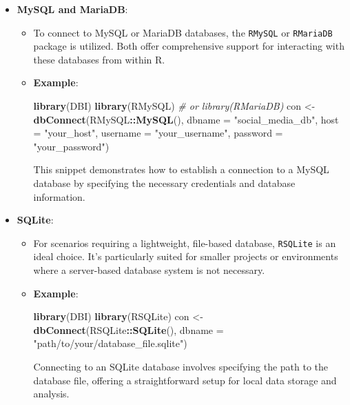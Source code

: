 \documentclass[
]{book}
\newenvironment{Shaded}{\begin{snugshade}}{\end{snugshade}}
\newcommand{\AttributeTok}[1]{\textcolor[rgb]{0.13,0.29,0.53}{#1}}
\newcommand{\CommentTok}[1]{\textcolor[rgb]{0.56,0.35,0.01}{\textit{#1}}}
\newcommand{\FunctionTok}[1]{\textcolor[rgb]{0.13,0.29,0.53}{\textbf{#1}}}
\newcommand{\NormalTok}[1]{#1}
\newcommand{\OtherTok}[1]{\textcolor[rgb]{0.56,0.35,0.01}{#1}}
\newcommand{\SpecialCharTok}[1]{\textcolor[rgb]{0.81,0.36,0.00}{\textbf{#1}}}
\newcommand{\StringTok}[1]{\textcolor[rgb]{0.31,0.60,0.02}{#1}}
\providecommand{\tightlist}{%
  \setlength{\itemsep}{0pt}\setlength{\parskip}{0pt}}
\begin{document}
\begin{itemize}
\tightlist
\item
  \textbf{MySQL and MariaDB}:

  \begin{itemize}
  \item
    To connect to MySQL or MariaDB databases, the \texttt{RMySQL} or \texttt{RMariaDB} package is utilized. Both offer comprehensive support for interacting with these databases from within R.
  \item
    \textbf{Example}:

\begin{Shaded}
\begin{Highlighting}[]
\FunctionTok{library}\NormalTok{(DBI)}
\FunctionTok{library}\NormalTok{(RMySQL) }\CommentTok{\# or library(RMariaDB)}
\NormalTok{con }\OtherTok{\textless{}{-}} \FunctionTok{dbConnect}\NormalTok{(RMySQL}\SpecialCharTok{::}\FunctionTok{MySQL}\NormalTok{(), }\AttributeTok{dbname =} \StringTok{"social\_media\_db"}\NormalTok{, }\AttributeTok{host =} \StringTok{"your\_host"}\NormalTok{, }\AttributeTok{username =} \StringTok{"your\_username"}\NormalTok{, }\AttributeTok{password =} \StringTok{"your\_password"}\NormalTok{)}
\end{Highlighting}
\end{Shaded}

    This snippet demonstrates how to establish a connection to a MySQL database by specifying the necessary credentials and database information.
  \end{itemize}
\item
  \textbf{SQLite}:

  \begin{itemize}
  \item
    For scenarios requiring a lightweight, file-based database, \texttt{RSQLite} is an ideal choice. It's particularly suited for smaller projects or environments where a server-based database system is not necessary.
  \item
    \textbf{Example}:

\begin{Shaded}
\begin{Highlighting}[]
\FunctionTok{library}\NormalTok{(DBI)}
\FunctionTok{library}\NormalTok{(RSQLite)}
\NormalTok{con }\OtherTok{\textless{}{-}} \FunctionTok{dbConnect}\NormalTok{(RSQLite}\SpecialCharTok{::}\FunctionTok{SQLite}\NormalTok{(), }\AttributeTok{dbname =} \StringTok{"path/to/your/database\_file.sqlite"}\NormalTok{)}
\end{Highlighting}
\end{Shaded}

    Connecting to an SQLite database involves specifying the path to the database file, offering a straightforward setup for local data storage and analysis.
  \end{itemize}
\end{itemize}
\end{document}
